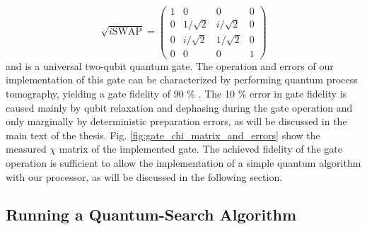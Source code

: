 \begin{equation}
	\sqrt{i\mathrm{SWAP}}  =  \left( \begin{array}{cccc} 1 & 0 & 0 & 0 \\ 0 & 1/\sqrt{2} & i/\sqrt{2} & 0 \\ 0 & i/\sqrt{2} & 1/\sqrt{2} & 0 \\ 0 & 0 & 0 & 1 \end{array} \right) \label{eq:sqrt_iswap_gate}
\end{equation}
and is a universal two-qubit quantum gate. The operation and errors of our implementation of this gate can be characterized by performing quantum process tomography, yielding a gate fidelity of 90 \% . The 10 \% error in gate fidelity is caused mainly by qubit relaxation and dephasing during the gate operation and only marginally by deterministic preparation errors, as will be discussed in the main text of the thesis. Fig. \ref{fig:gate_chi_matrix_and_errors} show the measured $\chi$ matrix of the implemented gate. The achieved fidelity of the gate operation is sufficient to allow the implementation of a simple quantum algorithm with our processor, as will be discussed in the following section.
 
\subsection{Running a Quantum-Search Algorithm}

